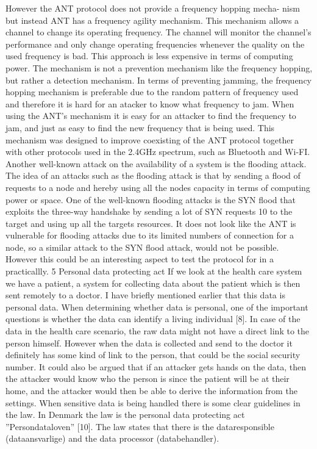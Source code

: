 However the ANT protocol does not provide a frequency hopping mecha- nism but instead ANT has a frequency agility mechanism. This mechanism allows a channel to change its operating frequency. The channel will monitor the channel’s performance and only change operating frequencies whenever the quality on the used frequency is bad. This approach is less expensive in terms of computing power. The mechanism is not a prevention mechanism like the frequency hopping, but rather a detection mechanism. In terms of preventing jamming, the frequency hopping mechanism is preferable due to the random pattern of frequency used and therefore it is hard for an atacker to know what frequency to jam. When using the ANT’s mechanism it is easy for an attacker to find the frequency to jam, and just as easy to find the new frequency that is being used. This mechanism was designed to improve coexisting of the ANT protocol together with other protocols used in the 2.4GHz spectrum, such as Bluetooth and Wi-FI.
Another well-known attack on the availability of a system is the flooding attack. The idea of an attacks such as the flooding attack is that by sending a flood of requests to a node and hereby using all the nodes capacity in terms of computing power or space. One of the well-known flooding attacks is the SYN flood that exploits the three-way handshake by sending a lot of SYN requests
10
to the target and using up all the targets resources.
It does not look like the ANT is vulnerable for flooding attacks due to its limited numbers of connection for a node, so a similar attack to the SYN flood attack, would not be possible. However this could be an interesting aspect to test the protocol for in a practicallly.
5 Personal data protecting act
If we look at the health care system we have a patient, a system for collecting data about the patient which is then sent remotely to a doctor. I have briefly mentioned earlier that this data is personal data. When determining whether data is personal, one of the important questions is whether the data can identify a living individual [8]. In case of the data in the health care scenario, the raw data might not have a direct link to the person himself. However when the data is collected and send to the doctor it definitely has some kind of link to the person, that could be the social security number. It could also be argued that if an attacker gets hands on the data, then the attacker would know who the person is since the patient will be at their home, and the attacker would then be able to derive the information from the settings.
When sensitive data is being handled there is some clear guidelines in the law. In Denmark the law is the personal data protecting act ”Persondataloven” [10]. The law states that there is the dataresponsible (dataansvarlige) and the data processor (databehandler).
